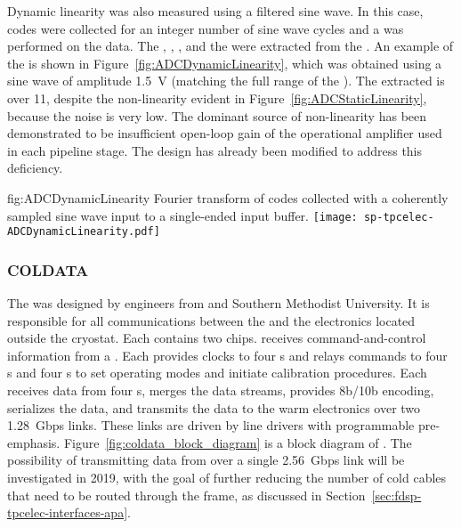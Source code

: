 Dynamic linearity was also measured using a filtered sine wave. In this case,  codes were
collected for an integer number of sine wave cycles and a  was performed on the data. 
The , , , and the  were extracted from the .
An example of the  is shown in Figure~\ref{fig:ADCDynamicLinearity}, which was obtained 
using a sine wave of amplitude \SI{1.5}{V} (matching the full range of the ).
The extracted  is over \num{11}, despite the non-linearity evident in 
Figure~\ref{fig:ADCStaticLinearity}, because the  noise is very low.
The dominant source of non-linearity has been demonstrated to be insufficient 
open-loop gain of the operational amplifier used in each pipeline stage. 
The design has already been modified to address this deficiency.

\begin{dunefigure}
{fig:ADCDynamicLinearity}
{Fourier transform of  codes collected with a coherently sampled sine wave input to a 
single-ended input buffer.}
\texttt{[image: sp-tpcelec-ADCDynamicLinearity.pdf]}
\end{dunefigure}


\subsubsection{COLDATA }
\label{sec:fdsp-tpcelec-design-femb-coldata}

The   was designed by engineers from  
and Southern Methodist University. It is responsible for all communications 
between the  and the electronics located outside the cryostat. 
Each  contains two  chips.  receives 
command-and-control information from a . Each  provides 
clocks to four s and relays commands to four s
and four s to set operating modes and 
initiate calibration procedures.  Each  receives data from four 
s, merges the data streams, provides 8b/10b encoding, serializes 
the data, and transmits the data to the warm electronics over two \SI{1.28}{Gbps} 
links.  These links are driven by line drivers with programmable pre-emphasis. 
Figure~\ref{fig:coldata_block_diagram} is a block diagram of . 
The possibility of transmitting data from  over a single 
\SI{2.56}{Gbps} link will be investigated in 2019, with the goal of further
reducing the number of cold cables that need to be routed through the
 frame, as discussed in Section~\ref{sec:fdsp-tpcelec-interfaces-apa}.

